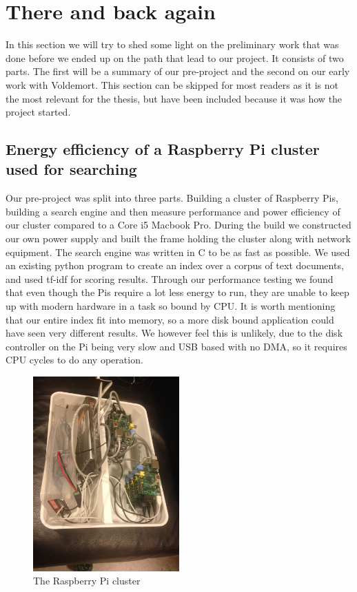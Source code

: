 \section{There and back again}
\label{sec:prequel}
In this section we will try to shed some light on the preliminary work that was done before we ended up on the path that lead to our project. It consists of two parts. The first will be a summary of our pre-project and the second on our early work with Voldemort. 
This section can be skipped for most readers as it is not the most relevant for the thesis, but have been included because it was how the project started.

\subsection{Energy efficiency of a Raspberry Pi cluster used for searching}
Our pre-project was split into three parts. Building a cluster of Raspberry Pis, building a search engine and then measure performance and power efficiency of our cluster compared to a Core i5 Macbook Pro. During the build we constructed our own power supply and built the frame holding the cluster along with network equipment. The search engine was written in C to be as fast as possible. We used an existing python program to create an index over a corpus of text documents, and used tf-idf for scoring results. Through our performance testing we found that even though the Pis require a lot less energy to run, they are unable to keep up with modern hardware in a task so bound by CPU. It is worth mentioning that our entire index fit into memory, so a more disk bound application could have seen very different results. We however feel this is unlikely, due to the disk controller on the Pi being very slow and USB based with no DMA, so it requires CPU cycles to do any operation.

\begin{figure}[h]
    \centering
    \includegraphics[width=0.5\textwidth]{introduction/figures/cluster_beautiful}
    \caption{The Raspberry Pi cluster}
    \label{fig:cluster}
\end{figure}

